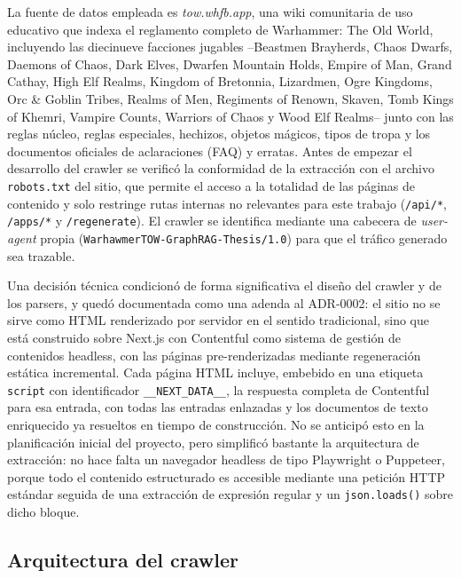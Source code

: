 \documentclass[11pt,a4paper,spanish]{book}
\numberwithin{equation}{chapter}
\numberwithin{figure}{chapter}
\numberwithin{table}{chapter}
\begin{document}
La fuente de datos empleada es \emph{tow.whfb.app}, una wiki comunitaria de uso educativo que indexa el reglamento completo de Warhammer: The Old World, incluyendo las diecinueve facciones jugables --Beastmen Brayherds, Chaos Dwarfs, Daemons of Chaos, Dark Elves, Dwarfen Mountain Holds, Empire of Man, Grand Cathay, High Elf Realms, Kingdom of Bretonnia, Lizardmen, Ogre Kingdoms, Orc \& Goblin Tribes, Realms of Men, Regiments of Renown, Skaven, Tomb Kings of Khemri, Vampire Counts, Warriors of Chaos y Wood Elf Realms-- junto con las reglas núcleo, reglas especiales, hechizos, objetos mágicos, tipos de tropa y los documentos oficiales de aclaraciones (FAQ) y erratas. Antes de empezar el desarrollo del crawler se verificó la conformidad de la extracción con el archivo \texttt{robots.txt} del sitio, que permite el acceso a la totalidad de las páginas de contenido y solo restringe rutas internas no relevantes para este trabajo (\texttt{/api/*}, \texttt{/apps/*} y \texttt{/regenerate}). El crawler se identifica mediante una cabecera de \emph{user-agent} propia (\texttt{WarhawmerTOW-GraphRAG-Thesis/1.0}) para que el tráfico generado sea trazable.

Una decisión técnica condicionó de forma significativa el diseño del crawler y de los parsers, y quedó documentada como una adenda al ADR-0002: el sitio no se sirve como HTML renderizado por servidor en el sentido tradicional, sino que está construido sobre Next.js con Contentful como sistema de gestión de contenidos headless, con las páginas pre-renderizadas mediante regeneración estática incremental. Cada página HTML incluye, embebido en una etiqueta \texttt{script} con identificador \texttt{\_\_NEXT\_DATA\_\_}, la respuesta completa de Contentful para esa entrada, con todas las entradas enlazadas y los documentos de texto enriquecido ya resueltos en tiempo de construcción. No se anticipó esto en la planificación inicial del proyecto, pero simplificó bastante la arquitectura de extracción: no hace falta un navegador headless de tipo Playwright o Puppeteer, porque todo el contenido estructurado es accesible mediante una petición HTTP estándar seguida de una extracción de expresión regular y un \texttt{json.loads()} sobre dicho bloque.

\subsection{Arquitectura del crawler}
\end{document}
